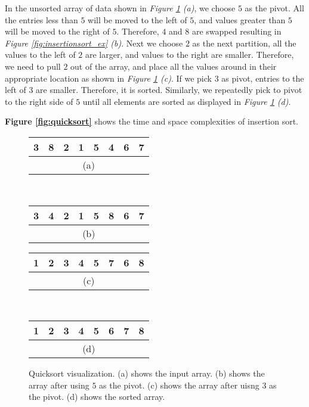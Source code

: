 In the unsorted array of data shown in \textit{Figure \ref{fig:quicksort_ex} (a)}, we choose $5$ as the pivot. All the entries less than $5$ will be moved to the left of $5$, and values greater than $5$ will be moved to the right of $5$. Therefore, $4$ and $8$ are swapped resulting in \textit{Figure \ref{fig:insertionsort_ex} (b)}. Next we choose $2$ as the next partition, all the values to the left of $2$ are larger, and values to the right are smaller. Therefore, we need to pull $2$ out of the array, and place all the values around in their appropriate location as shown in \textit{Figure \ref{fig:quicksort_ex} (c)}. If we pick $3$ as pivot, entries to the left of $3$ are smaller. Therefore, it is sorted. Similarly, we repeatedly pick to pivot to the right side of $5$ until all elements are sorted as displayed in \textit{Figure \ref{fig:quicksort_ex} (d)}.

\textbf{Figure \ref{fig:quicksort}} shows the time and space complexities of insertion sort.

\begin{figure}[!ht]
    \centering
    \begin{tabular}{|c|c|c|c|c|c|c|c|}
    \hline
    3 & 8 & 2 & 1 & \cellcolor{lightgray}5 & 4 & 6 & 7 \\
    \hline
    \multicolumn{8}{c}{(a)} \\
    \end{tabular}
    \,
    \begin{tabular}{|c|c|c|c|c|c|c|c|}
    \hline
    3 & 4 & \cellcolor{lightgray}2 & 1 & 5 & 8 & 6 & 7 \\
    \hline
    \multicolumn{8}{c}{(b)} \\
    \end{tabular}
    \break
    \begin{tabular}{|c|c|c|c|c|c|c|c|}
    \hline
    1 & 2 & \cellcolor{lightgray}3 & 4 & 5 & 7 & 6 & 8 \\
    \hline
    \multicolumn{8}{c}{(c)} \\
    \end{tabular}
    \,
    \begin{tabular}{|c|c|c|c|c|c|c|c|}
    \hline
    1 & 2 & 3 & 4 & 5 & 6 & 7 & 8 \\
    \hline
    \multicolumn{8}{c}{(d)} \\
    \end{tabular}
    
    \caption{Quicksort visualization. (a) shows the input array. (b) shows the array after using $5$ as the pivot. (c) shows the array after uisng 3 as the pivot. (d) shows the sorted array.}
    \label{fig:quicksort_ex}
\end{figure}

